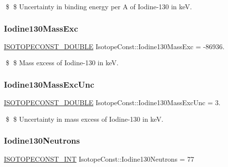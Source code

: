 \$ \$ Uncertainty in binding energy per A of Iodine-\/130 in keV. \mbox{\label{group___isotope_const-_iodine-_i130_ga355c57065cd0d3748b41a8986c4222c5}} 
\subsubsection{\texorpdfstring{Iodine130\+Mass\+Exc}{Iodine130MassExc}}
{\footnotesize\ttfamily \mbox{\hyperlink{group___isotope_const-_macros_ga8f45a7272ce02c0b4c65c44636ed719a}{I\+S\+O\+T\+O\+P\+E\+C\+O\+N\+S\+T\+\_\+\+D\+O\+U\+B\+LE}} Isotope\+Const\+::\+Iodine130\+Mass\+Exc = -\/86936.}

\$ \$ Mass excess of Iodine-\/130 in keV. \mbox{\label{group___isotope_const-_iodine-_i130_gaf71dede910b565c379a5dc803bb50ae7}} 
\subsubsection{\texorpdfstring{Iodine130\+Mass\+Exc\+Unc}{Iodine130MassExcUnc}}
{\footnotesize\ttfamily \mbox{\hyperlink{group___isotope_const-_macros_ga8f45a7272ce02c0b4c65c44636ed719a}{I\+S\+O\+T\+O\+P\+E\+C\+O\+N\+S\+T\+\_\+\+D\+O\+U\+B\+LE}} Isotope\+Const\+::\+Iodine130\+Mass\+Exc\+Unc = 3.}

\$ \$ Uncertainty in mass excess of Iodine-\/130 in keV. \mbox{\label{group___isotope_const-_iodine-_i130_gaead3095c79ed84981f951b1bc5b53bd6}} 
\subsubsection{\texorpdfstring{Iodine130\+Neutrons}{Iodine130Neutrons}}
{\footnotesize\ttfamily \mbox{\hyperlink{group___isotope_const-_macros_ga5f18360b3e99483a35c32d789e62621c}{I\+S\+O\+T\+O\+P\+E\+C\+O\+N\+S\+T\+\_\+\+I\+NT}} Isotope\+Const\+::\+Iodine130\+Neutrons = 77}

